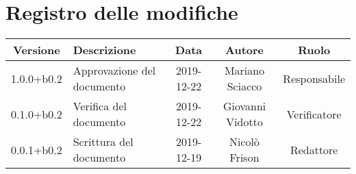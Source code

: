 \section*{Registro delle modifiche}

\begin{center}
	\begin{longtable}{|c|p{3cm}|c|c|c|}
	\hline
	\rowcolor{lighter-grayer}
	\textbf{Versione} & \textbf{Descrizione} & \textbf{Data} & \textbf{Autore} & \textbf{Ruolo} \\
	\hline
	\endfirsthead


	1.0.0+b0.2 & Approvazione del documento & 2019-12-22 & Mariano Sciacco & Responsabile \\
	\hline
	0.1.0+b0.2 & Verifica del documento & 2019-12-22 & Giovanni Vidotto & Verificatore \\
	\hline
	0.0.1+b0.2 & Scrittura del documento & 2019-12-19 & Nicolò Frison & Redattore \\
	\hline

	\end{longtable}
\end{center}